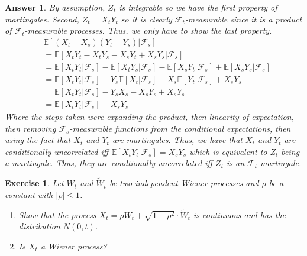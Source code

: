\documentclass[12pt]{article}
\theoremstyle{colon}
\newtheorem{exercise}{Exercise}
\newtheorem*{answer}{Answer}
\begin{document}
\begin{answer}
  By assumption, $Z_t$ is integrable so we have the first property of martingales. Second, $Z_t = X_t Y_t$ so it is clearly $\mathcal{F}_t$-measurable since it is a product of $\mathcal{F}_t$-measurable processes. Thus, we only have to show the last property.
  \begin{align*}
    &\mathbb{E}[(X_t - X_s)(Y_t - Y_s) | \mathcal{F}_s] \\
    &= \mathbb{E}[X_t Y_t - X_t Y_s - X_s Y_t + X_s Y_s | \mathcal{F}_s] \\
    &= \mathbb{E}[X_t Y_t | \mathcal{F}_s] - \mathbb{E}[X_t Y_s | \mathcal{F}_s] - \mathbb{E}[X_s Y_t | \mathcal{F}_s] + \mathbb{E}[X_s Y_s | \mathcal{F}_s] \\
    &= \mathbb{E}[X_t Y_t | \mathcal{F}_s] - Y_s \mathbb{E}[X_t | \mathcal{F}_s] - X_s \mathbb{E}[Y_t | \mathcal{F}_s] + X_s Y_s \\
    &= \mathbb{E}[X_t Y_t | \mathcal{F}_s] - Y_s X_s - X_s Y_s + X_s Y_s \\
    &= \mathbb{E}[X_t Y_t | \mathcal{F}_s] - X_s Y_s
  \end{align*}
  Where the steps taken were expanding the product, then linearity of expectation, then removing $\mathcal{F}_s$-measurable functions from the conditional expectations, then using the fact that $X_t$ and $Y_t$ are martingales. Thus, we have that $X_t$ and $Y_t$ are conditionally uncorrelated iff $\mathbb{E}[X_t Y_t | \mathcal{F}_s] = X_s Y_s$ which is equivalent to $Z_t$ being a martingale. Thus, they are condtionally uncorrelated iff $Z_t$ is an $\mathcal{F}_t$-martingale.
\end{answer}

\clearpage

\begin{exercise}
  Let $W_t$ and $\widetilde{W}_t$ be two independent Wiener processes and $\rho$ be a constant with $\lvert \rho \rvert \leq 1$.
  \begin{enumerate}[label=\alph*)]
    \item Show that the process $X_t = \rho W_t + \sqrt{1 - \rho^2} \cdot \widetilde{W}_t$ is continuous and has the distribution $N(0,t)$.
    \item Is $X_t$ a Wiener process?
  \end{enumerate}
\end{exercise}
\end{document}
